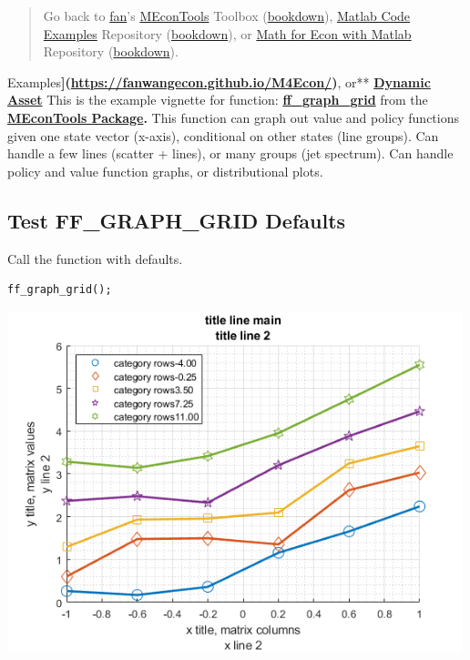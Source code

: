 \documentclass[
]{book}
\begin{document}
\begin{quote}
Go back to \href{http://fanwangecon.github.io/}{fan}'s \href{https://fanwangecon.github.io/MEconTools/}{MEconTools} Toolbox (\href{https://fanwangecon.github.io/MEconTools/bookdown}{bookdown}), \href{https://fanwangecon.github.io/M4Econ/}{Matlab Code Examples} Repository (\href{https://fanwangecon.github.io/M4Econ/bookdown}{bookdown}), or \href{https://fanwangecon.github.io/Math4Econ/}{Math for Econ with Matlab} Repository (\href{https://fanwangecon.github.io/Math4Econ/bookdown}{bookdown}).
\end{quote}

Examples\textbf{{]}(\url{https://fanwangecon.github.io/M4Econ/})}, or** \href{https://fanwangecon.github.io/CodeDynaAsset/}{\textbf{Dynamic
Asset}}
This is the example vignette for function:
\href{https://github.com/FanWangEcon/MEconTools/blob/master/MEconTools/graph/ff_graph_grid.m}{\textbf{ff\_graph\_grid}}
from the \href{https://fanwangecon.github.io/MEconTools/}{\textbf{MEconTools
Package}}\textbf{.} This function
can graph out value and policy functions given one state vector
(x-axis), conditional on other states (line groups). Can handle a few
lines (scatter + lines), or many groups (jet spectrum). Can handle
policy and value function graphs, or distributional plots.

\hypertarget{test-ff_graph_grid-defaults}{%
\subsection{Test FF\_GRAPH\_GRID Defaults}\label{test-ff_graph_grid-defaults}}

Call the function with defaults.

\begin{verbatim}
ff_graph_grid();
\end{verbatim}

\includegraphics[width=5.20833in,height=\textheight]{img/fx_graph_grid_images/figure_0.png}
\end{document}
